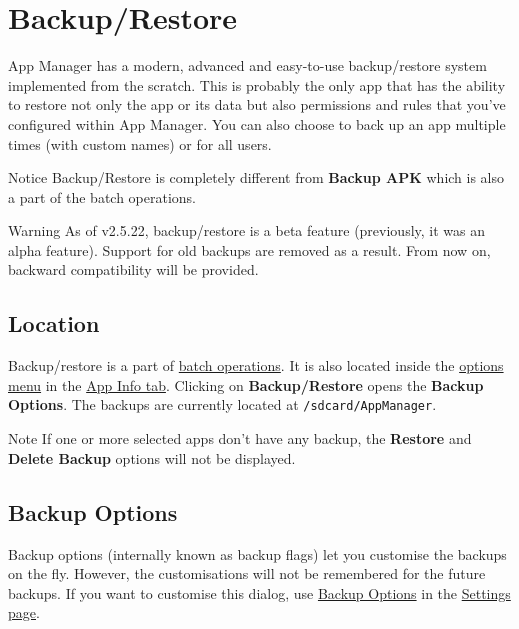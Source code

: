 \section{Backup/Restore}\label{sec:backup-restore}
App Manager has a modern, advanced and easy-to-use backup/restore system implemented from the scratch. This is probably
the only app that has the ability to restore not only the app or its data but also permissions and rules that you've
configured within App Manager. You can also choose to back up an app multiple times (with custom names) or for all users.

\begin{tip}{Notice}
    Backup/Restore is completely different from \textbf{Backup APK} which is also a part of the batch operations.
\end{tip}

\begin{warning}{Warning}
    As of v2.5.22, backup/restore is a beta feature (previously, it was an alpha feature). Support for old backups are
    removed as a result. From now on, backward compatibility will be provided.
\end{warning}

\subsection{Location}\label{subsec:backup-location}
Backup/restore is a part of \hyperref[subsec:batch-operations]{batch operations}. It is also located inside the
\hyperref[subsubsec:app-info-options-menu]{options menu} in the \hyperref[subsec:app-info-tab]{App Info tab}. Clicking
on \textbf{Backup/Restore} opens the \textbf{Backup Options}. The backups are currently located at
\texttt{/sdcard/AppManager}.

\begin{tip}{Note}
    If one or more selected apps don't have any backup, the \textbf{Restore} and \textbf{Delete Backup} options will not
    be displayed.
\end{tip}

\subsection{Backup Options}\label{subsec:backup-restore-backup-options}
Backup options (internally known as backup flags) let you customise the backups on the fly. However, the customisations
will not be remembered for the future backups. If you want to customise this dialog, use
\hyperref[subsubsec:settings-backup-options]{Backup Options} in the \hyperref[sec:settings-page]{Settings page}.

